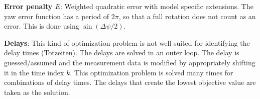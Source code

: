 \documentclass[12pt]{article}
\begin{document}
\textbf{Error penalty $E$}: Weighted quadratic error with model specific extensions. The yaw error function has a period of $2\pi$, so that a full rotation does not count as an error. This is done using $\sin(\Delta\psi/2)$.


\textbf{Delays}: This kind of optimization problem is not well suited for identifying the delay times (Totzeiten). The delays are solved in an outer loop. The delay is guessed/assumed and the measurement data is modified by appropriately shifting it in the time index $k$. This optimization problem is solved many times for combinations of delay times. The delays that create the lowest objective value are taken as the solution.
\end{document}
